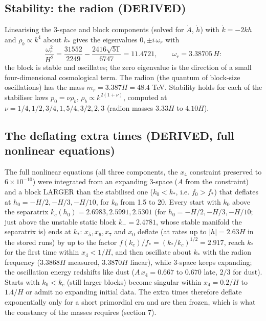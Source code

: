 \documentclass[
  10pt,
]{article}
\begin{document}
\hypertarget{stability-the-radion-derived}{%
\subsection{Stability: the radion
(DERIVED)}\label{stability-the-radion-derived}}

Linearising the 3-space and block components (solved for \(\dot A\),
\(\dot h\)) with \(\dot k = -2kh\) and \(\rho_b \propto k^4\) about
\(k_*\) gives the eigenvalues \(0, \pm i\,\omega_r\) with
\[ \frac{\omega_r^2}{H^2} = \frac{31552}{2249} - \frac{2416\sqrt{51}}{6747} = 11.4721,\qquad \omega_r = 3.38705\,H : \]
the block is stable and oscillates; the zero eigenvalue is the direction
of a small four-dimensional cosmological term. The radion (the quantum
of block-size oscillations) has the mass \(m_r = 3.387H = 48.4\) TeV.
Stability holds for each of the stabiliser laws \(p_0 = \nu\rho_b\),
\(\rho_b \propto k^{2(1+\nu)}\), computed at
\(\nu = 1/4, 1/2, 3/4, 1, 5/4, 3/2, 2, 3\) (radion masses \(3.33H\) to
\(4.10H\)).

\hypertarget{the-deflating-extra-times-derived-full-nonlinear-equations}{%
\subsection{The deflating extra times (DERIVED, full nonlinear
equations)}\label{the-deflating-extra-times-derived-full-nonlinear-equations}}

The full nonlinear equations (all three components, the \(x_4\)
constraint preserved to \(6\times10^{-10}\)) were integrated from an
expanding 3-space (\(A\) from the constraint) and a block LARGER than
the stabilised one (\(k_0 < k_*\), i.e. \(f_0 > f_*\)) that deflates at
\(h_0 = -H/2, -H/3, -H/10\), for \(k_0\) from 1.5 to 20. Every start
with \(k_0\) above the separatrix \(k_c(h_0) = 2.6983, 2.5991, 2.5301\)
(for \(h_0 = -H/2, -H/3, -H/10\); just above the unstable static block
\(k_- = 2.4781\), whose stable manifold the separatrix is) ends at
\(k_*\): \(x_5, x_6, x_7\) and \(x_0\) deflate (at rates up to
\(|h| = 2.63H\) in the stored runs) by up to the factor
\(f(k_c)/f_* = (k_*/k_c)^{1/2} = 2.917\), reach \(k_*\) for the first
time within \(x_4 < 1/H\), and then oscillate about \(k_*\) with the
radion frequency (\(3.3868H\) measured, \(3.3870H\) linear), while
3-space keeps expanding; the oscillation energy redshifts like dust
(\(A\,x_4 = 0.667\) to \(0.670\) late, \(2/3\) for dust). Starts with
\(k_0 < k_c\) (still larger blocks) become singular within
\(x_4 = 0.2/H\) to \(1.4/H\) or admit no expanding initial data. The
extra times therefore deflate exponentially only for a short primordial
era and are then frozen, which is what the constancy of the masses
requires (section 7).
\end{document}
